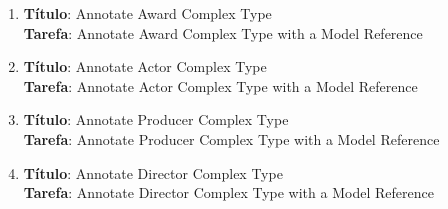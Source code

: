 
\begin{tcolorbox}
    \begin{enumerate}[label=(T\arabic*)]
        
        \setlength{\parskip}{0.55cm}
        
    
        \item 
        \textbf{Título}: Annotate Award Complex Type
        \\
        \textbf{Tarefa}: Annotate Award Complex Type with a Model Reference
        
    
        \item 
        \textbf{Título}: Annotate Actor Complex Type
        \\
        \textbf{Tarefa}: Annotate Actor Complex Type with a Model Reference
        
    
        \item 
        \textbf{Título}: Annotate Producer Complex Type
        \\
        \textbf{Tarefa}: Annotate Producer Complex Type with a Model Reference
        
        
%    
%
%        
%        
        
    
        \item 
        \textbf{Título}: Annotate Director Complex Type
        \\
        \textbf{Tarefa}: Annotate Director Complex Type with a Model Reference
        

\end{enumerate}
\end{tcolorbox}
